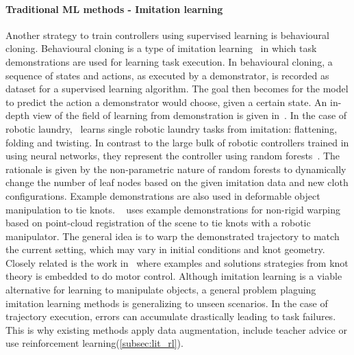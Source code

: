 \documentclass[\home/main.tex]{subfiles}
\begin{document}
\paragraph{Traditional ML methods - Imitation learning}
Another strategy to train controllers using supervised learning is behavioural cloning. Behavioural cloning is a type of imitation learning~\autocite{Argall2009} in which task demonstrations are used for learning task execution. In behavioural cloning, a sequence of states and actions, as executed by a demonstrator, is recorded as dataset for a supervised learning algorithm. The goal then becomes for the model to predict the action a demonstrator would choose, given a certain state. 
An in-depth view of the field of learning from demonstration is given in~\autocite{Argall2009}. In the case of robotic laundry,~\textcite{Jia2019} learns single robotic laundry tasks from imitation: flattening, folding and twisting. In contrast to the large bulk of robotic controllers trained in \citeyear{Jia2019} using neural networks, they represent the controller using random forests~\autocite{Breiman2001}. The rationale is given by the non-parametric nature of random forests to dynamically change the number of leaf nodes based on the given imitation data and new cloth configurations. Example demonstrations are also used in deformable object manipulation to tie knots. ~\textcite{Schulman2016learning} uses example demonstrations for non-rigid warping~\autocite{Chui2003} based on point-cloud registration of the scene to tie knots with a robotic manipulator. The general idea is to warp the demonstrated trajectory to match the current setting, which may vary in initial conditions and knot geometry. Closely related is the work in~\autocite{Morita2003} where examples and solutions strategies from knot theory is embedded to do motor control. Although imitation learning is a viable alternative for learning to manipulate objects, a general problem plaguing imitation learning methods is generalizing to unseen scenarios. In the case of trajectory execution, errors can accumulate drastically leading to task failures. This is why existing methods apply data augmentation, include teacher advice or use reinforcement learning(\cref{subsec:lit_rl}).
\end{document}
